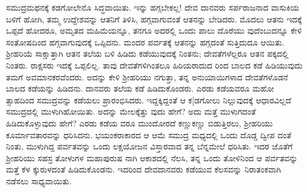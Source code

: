ಸಮುದ್ರಮಥನಕ್ಕೆ ಕಡಗೋಲೇನೊ ಸಿದ್ಧವಾಯಿತು. ಇನ್ನು ಹಗ್ಗಬೇಕಲ್ಲ! ದೇವ ದಾನವರು ಸರ್ಪರಾಜನಾದ ವಾಸುಕಿಯ ಬಳಿಗೆ ಹೋಗಿ, ತಮ್ಮ ಉದ್ದೇಶವನ್ನು ಆತನಿಗೆ ತಿಳಿಸಿ, ಹಗ್ಗವಾಗುವಂತೆ ಆತನನ್ನು ಬೇಡಿದರು. ಮೊದಲು ಆತನು ಇದಕ್ಕೆ ಒಪ್ಪದೆ ಹೋದರೂ, ಅಮೃತದ ಮಹಿಮೆಯನ್ನೂ, ತನಗೂ ಅದರಲ್ಲಿ ಒಂದು ಪಾಲು ದೊರೆಯು ವುದೆಂಬುದನ್ನೂ ಕೇಳಿ ಸಂತೋಷದಿಂದ ಹಗ್ಗವಾಗುವುದಕ್ಕೆ ಒಪ್ಪಿದನು. ಮಂದರ ಪರ್ವತಕ್ಕೆ ಆತನನ್ನು ಹಗ್ಗದಂತೆ ಸುತ್ತಿದುದೂ ಆಯಿತು. ಶ್ರೀಹರಿಯೆ ಸಾಕ್ಷಾತ್ತಾಗಿ ಆತನ ತಲೆಯ ಬಳಿ ಹಿಡಿದು ಕಡೆಯುವುದಕ್ಕೆ ನಿಂತನು; ದೇವತೆಗಳೆಲ್ಲರೂ ಆತನ ಪಕ್ಕದಲ್ಲಿ ನಿಂತರು. ರಾಕ್ಷಸರು ಇದಕ್ಕೆ ಒಪ್ಪಲಿಲ್ಲ. ತಾವು ದೇವತೆಗಳಿಗಿಂತಲೂ ಹಿರಿಯರಾದುದ ರಿಂದ ಬಾಲದ ಕಡೆ ಹಿಡಿಯುವುದು ತಮಗೆ ಅವಮಾನಕರವೆಂದರು. ಅದನ್ನು ಕೇಳಿ ಶ್ರೀಹರಿಯು ನಗುತ್ತಾ, ತನ್ನ ಅನುಯಾಯಿಗಳಾದ ದೇವತೆಗಳೊಡನೆ ಬಾಲದ ಕಡೆಯನ್ನು ಹಿಡಿದನು. ದಾನವರು ತಲೆಯ ಕಡೆ ಹಿಡಿದುಕೊಂಡರು. ಎರಡು ಕಡೆಯವರೂ ಮಹೋ ತ್ಸಾಹದಿಂದ ಸಮುದ್ರವನ್ನು ಕಡೆಯಲು ಪ್ರಾರಂಭಿಸಿದರು. ಇದ್ದಕ್ಕಿದ್ದಂತೆ ಆ ಕ[ಡಗೋಲು ನಿಲ್ಲುವುದಕ್ಕೆ ಆಧಾರವಿಲ್ಲದೆ ಸಮುದ್ರದಲ್ಲಿ ಮುಳುಗಿಹೋಯಿತು. ಅದನ್ನು ಮೇಲಕ್ಕೆತ್ತು ವುದು ಹೇಗೆ? ಅದು ಮತ್ತೆ ಮುಳುಗದಂತೆ ಹಿಡಿದುಕೊಳ್ಳುವುದು ಹೇಗೆ? ಎರಡು ಕಡೆಯ ವರೂ ಮುಂದೋರದೆ ಕಣ್ಣುಕಣ್ಣು ಬಿಡುತ್ತಿರಲು, ಶ್ರೀಹರಿಯು ಕೂರ್ಮಾವತಾರವನ್ನು ಧರಿಸಿದನು. ಭಯಂಕರಾಕಾರದ ಆ ಆಮೆ ಸಮುದ್ರ ಮಧ್ಯದಲ್ಲಿ ಒಂದು ದೊಡ್ಡ ದ್ವೀಪ ದಂತೆ ನಿಂತು, ಮುಳುಗಿದ್ದ ಪರ್ವತವನ್ನು ಒಂದು ಲಕ್ಷಯೋಜನ ವಿಸ್ತಾರವಾದ ತನ್ನ ಬೆನ್ನಮೇಲೆ ಧರಿಸಿತು. ಇದರ ಜೊತೆಗೆ ಶ್ರೀಹರಿಯು ಸಹಸ್ರ ತೋಳುಗಳ ಮಹಾಪುರುಷ ನಾಗಿ ಆಕಾಶದಲ್ಲಿ ನೆಲಸಿ, ತನ್ನ ಒಂದು ತೋಳಿನಿಂದ ಆ ಪರ್ವತವನ್ನು ಮತ್ತೆ ಕೆಳ ಕ್ಕುರುಳದಂತೆ ಹಿಡಿದುಕೊಂಡನು. ಇದರಿಂದ ದೇವದಾನವರು ಕಡೆಯುವ ಕೆಲಸವನ್ನು ನಿರಾತಂಕವಾಗಿ ನಡೆಸಲು ಸಾಧ್ಯವಾಯಿತು.

